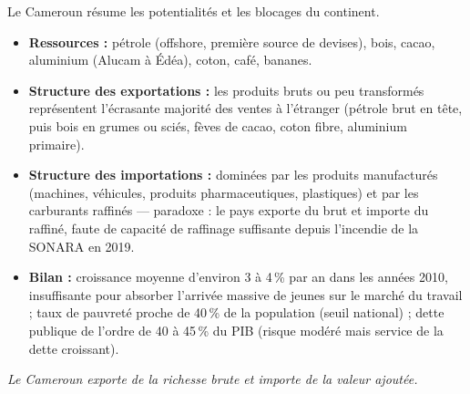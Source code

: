 \documentclass[11pt]{article}
\begin{document}
\begin{exemplebox}
Le Cameroun résume les potentialités et les blocages du continent.
\begin{itemize}
    \item \textbf{Ressources :} pétrole (offshore, première source de devises), bois, cacao, aluminium (Alucam à Édéa), coton, café, bananes.
    \item \textbf{Structure des exportations :} les produits bruts ou peu transformés représentent l'écrasante majorité des ventes à l'étranger (pétrole brut en tête, puis bois en grumes ou sciés, fèves de cacao, coton fibre, aluminium primaire).
    \item \textbf{Structure des importations :} dominées par les produits manufacturés (machines, véhicules, produits pharmaceutiques, plastiques) et par les carburants raffinés — paradoxe : le pays exporte du brut et importe du raffiné, faute de capacité de raffinage suffisante depuis l'incendie de la SONARA en 2019.
    \item \textbf{Bilan :} croissance moyenne d'environ 3 à 4\,\% par an dans les années 2010, insuffisante pour absorber l'arrivée massive de jeunes sur le marché du travail ; taux de pauvreté proche de 40\,\% de la population (seuil national) ; dette publique de l'ordre de 40 à 45\,\% du PIB (risque modéré mais service de la dette croissant).
\end{itemize}
\emph{Le Cameroun exporte de la richesse brute et importe de la valeur ajoutée.}
\end{exemplebox}
\end{document}
